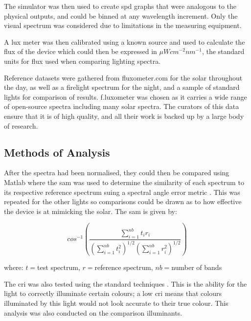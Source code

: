 The simulator was then used to create \acrfull{spd} graphs that were analogous to the physical outputs, and could be binned at any wavelength increment. Only the visual spectrum was considered due to limitations in the measuring equipment.

A \gls{lux} meter was then calibrated using a known source and used to calculate the \gls{flux} of the device which could then be expressed in $\mu W cm^{-2} nm^{-1}$, the standard units for \gls{flux} used when comparing lighting spectra.

Reference datasets were gathered from fluxometer.com \citep{f.luxsoftwarellcLuxometer} for the \gls{solar} throughout the day, as well as a firelight spectrum for the night, and a sample of standard lights for comparison of results. f.luxometer was chosen as it carries a wide range of open-source spectra including many solar spectra. The curators of this data ensure that it is of high quality, and all their work is backed up by a large body of research.

\subsection{Methods of Analysis}

After the spectra had been normalised, they could then be compared using Matlab where the \acrfull{sam} was used to determine the similarity of each spectrum to its respective reference spectrum suing a spectral angle error metric \citep{kruseSpectralImageProcessing1993}. This was repeated for the other lights so comparisons could be drawn as to how effective the device is at mimicking the \gls{solar}. The \acrshort{sam} is given by:

\begin{equation}
cos^{-1}\left(\frac{\sum\limits_{i=1}^{nb} t_i r_i}{\left(\sum\limits_{i=1}^{nb} t_i^2\right)^{1/2}\left(\sum\limits_{i=1}^{nb} r_i^2\right)^{1/2}}\right)
\end{equation}

\begin{center}
where: $t=$test spectrum, $r=$reference spectrum, $nb=$number of bands
\end{center}

The \acrfull{cri} was also tested using the standard techniques \citep{liCRICAM02UCSColourRendering2012}. This is the ability for the light to correctly illuminate certain colours; a low \acrshort{cri} means that colours illuminated by this light would not look accurate to their true colour. This analysis was also conducted on the comparison illuminants.


